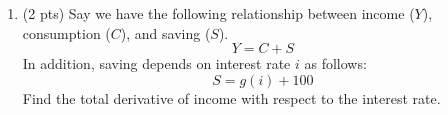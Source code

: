 \documentclass{./../../../Latex/tests}
\begin{document}
\begin{enumerate}
\vspace{2cm}

\item (2 pts) Say we have the following relationship between income ($Y$), consumption ($C$), and saving ($S$). 
$$ Y= C+S$$
In addition, saving depends on interest rate $i$ as follows:
$$ S = g(i)+100 $$
Find the total derivative of income with respect to the interest rate. 


\end{enumerate}
\end{document}
